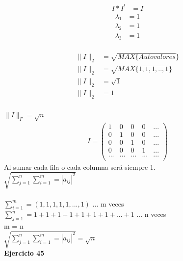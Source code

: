 \documentclass[12pt]{article}
\begin{document}
\begin{align*}
    I*I^{t} &= I
\end{align*}
\begin{align*}
    \lambda_{1} &= 1\\
    \lambda_{2} &= 1\\
    \lambda_{3} &= 1\\
\end{align*}

\begin{align*}
    \|I\|_{2} &= \sqrt{MAX\{Autovalores}\}\\
    \|I\|_{2} &= \sqrt{MAX\{1,1,1,..,1}\}\\
    \|I\|_{2} &= \sqrt{1}\\
    \|I\|_{2} &= 1\\
\end{align*}

$\|I\|_{F} = \sqrt{n}$\\

\begin{align*}
    I =
    \left( {\begin{array}{ccccc}
        1 & 0 & 0 & 0 & ...\\
        0 & 1 & 0 & 0 & ...\\
        0 & 0 & 1 & 0 & ...\\
        0 & 0 & 0 & 1 & ...\\
        ... & ... & ... & ... & ...\\
        \end{array} } \right)
\end{align*}
Al sumar cada fila o cada columna será siempre 1.\\
$\sqrt{\sum_{j=1}^{n}\sum_{i=1}^{m}=|a_{ij}|^{2}}$\\
\\
$\sum_{i=1}^{m}= (1,1,1,1,1,...,1)$ ... m veces\\
$\sum_{j=1}^{n} = 1+1+1+1+1+1+1+...+1$ ... n veces\\
m = n\\
$\sqrt{\sum_{j=1}^{n}\sum_{i=1}^{m}=|a_{ij}|^{2}} = \sqrt{n}$\\

\noindent \textbf{Ejercicio 45}
\end{document}
